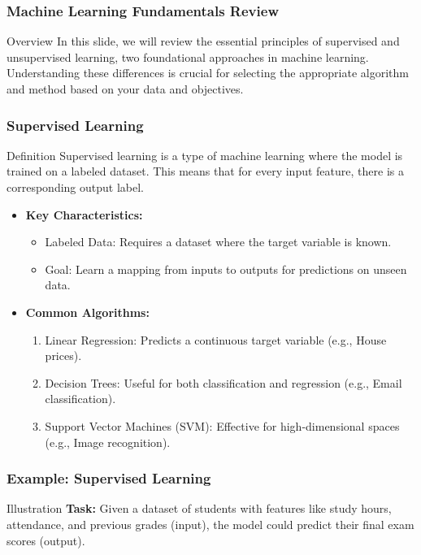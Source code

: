 \documentclass[aspectratio=169]{beamer}
\begin{document}
\begin{frame}[fragile]
    \frametitle{Machine Learning Fundamentals Review}
    \begin{block}{Overview}
        In this slide, we will review the essential principles of supervised and unsupervised learning, two foundational approaches in machine learning. Understanding these differences is crucial for selecting the appropriate algorithm and method based on your data and objectives.
    \end{block}
\end{frame}

\begin{frame}[fragile]
    \frametitle{Supervised Learning}

    \begin{block}{Definition}
        Supervised learning is a type of machine learning where the model is trained on a labeled dataset. This means that for every input feature, there is a corresponding output label.
    \end{block}

    \begin{itemize}
        \item \textbf{Key Characteristics:}
        \begin{itemize}
            \item Labeled Data: Requires a dataset where the target variable is known.
            \item Goal: Learn a mapping from inputs to outputs for predictions on unseen data.
        \end{itemize}
        
        \item \textbf{Common Algorithms:}
        \begin{enumerate}
            \item Linear Regression: Predicts a continuous target variable (e.g., House prices).
            \item Decision Trees: Useful for both classification and regression (e.g., Email classification).
            \item Support Vector Machines (SVM): Effective for high-dimensional spaces (e.g., Image recognition).
        \end{enumerate}
    \end{itemize}
\end{frame}

\begin{frame}[fragile]
    \frametitle{Example: Supervised Learning}

    \begin{block}{Illustration}
        \textbf{Task:} Given a dataset of students with features like study hours, attendance, and previous grades (input), the model could predict their final exam scores (output).
    \end{block}
\end{frame}
\end{document}
